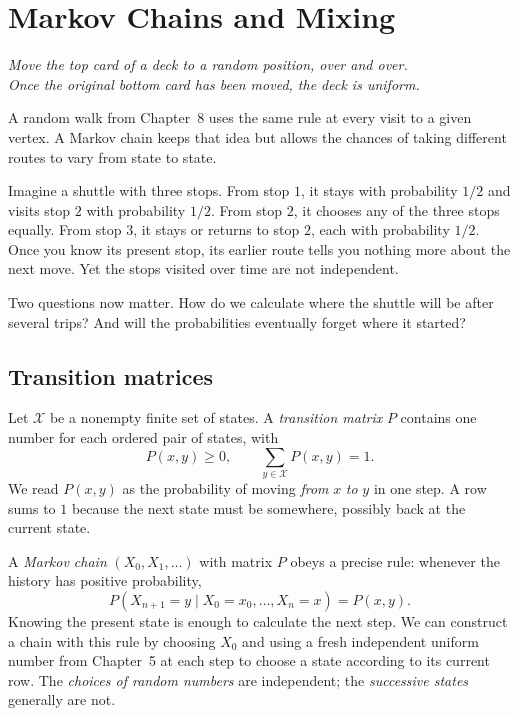 \chapter{Markov Chains and Mixing}

\begin{center}\itshape
Move the top card of a deck to a random position, over and over.\\
Once the original bottom card has been moved, the deck is uniform.
\end{center}

A random walk from Chapter~8 uses the same rule at every visit to a given vertex. A Markov chain keeps that idea but allows the chances of taking different routes to vary from state to state.

Imagine a shuttle with three stops. From stop $1$, it stays with probability $1/2$ and visits stop $2$ with probability $1/2$. From stop $2$, it chooses any of the three stops equally. From stop $3$, it stays or returns to stop $2$, each with probability $1/2$. Once you know its present stop, its earlier route tells you nothing more about the next move. Yet the stops visited over time are not independent.

Two questions now matter. How do we calculate where the shuttle will be after several trips? And will the probabilities eventually forget where it started?

\section{Transition matrices}

Let $\mathcal X$ be a nonempty finite set of states. A \emph{transition matrix} $P$ contains one number for each ordered pair of states, with
\[
 P(x,y)\ge0,\qquad \sum_{y\in\mathcal X}P(x,y)=1.
\]
We read $P(x,y)$ as the probability of moving \emph{from} $x$ \emph{to} $y$ in one step. A row sums to $1$ because the next state must be somewhere, possibly back at the current state.

A \emph{Markov chain} $(X_0,X_1,\ldots)$ with matrix $P$ obeys a precise rule: whenever the history has positive probability,
\[
 P(X_{n+1}=y\mid X_0=x_0,\ldots,X_n=x)=P(x,y).
\]
Knowing the present state is enough to calculate the next step. We can construct a chain with this rule by choosing $X_0$ and using a fresh independent uniform number from Chapter~5 at each step to choose a state according to its current row. The \emph{choices of random numbers} are independent; the \emph{successive states} generally are not.

